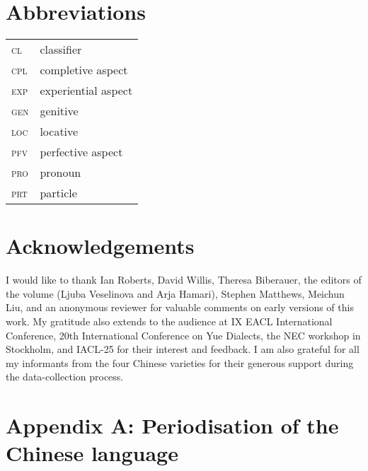 \documentclass[output=paper]{langscibook}
\begin{document}
\section*{Abbreviations}
\begin{tabularx}{.45\textwidth}{lQ}
\textsc{cl} & classifier\\
\textsc{cpl} &	completive aspect\\
\textsc{exp} &	experiential aspect\\ 
\textsc{gen} & 	genitive\\ 
\textsc{loc} &	locative\\ 
\textsc{pfv} &	perfective aspect\\ 
\textsc{pro} &	pronoun\\
\textsc{prt} & 	particle\\ 
\end{tabularx}


\section*{Acknowledgements}

I would like to thank Ian Roberts, David Willis, Theresa Biberauer, the editors of the volume (Ljuba Veselinova and Arja Hamari), Stephen Matthews, Meichun Liu, and an anonymous reviewer for valuable comments on early versions of this work. My gratitude also extends to the audience at IX EACL International Conference, 20th International Conference on Yue Dialects, the NEC workshop in Stockholm, and IACL-25 for their interest and feedback. I am also grateful for all my informants from the four Chinese varieties for their generous support during the data-collection process. 



\clearpage
\newpage
\section*{Appendix \hypertarget{app:lamA}{A}: Periodisation of the Chinese language}

\end{document}
